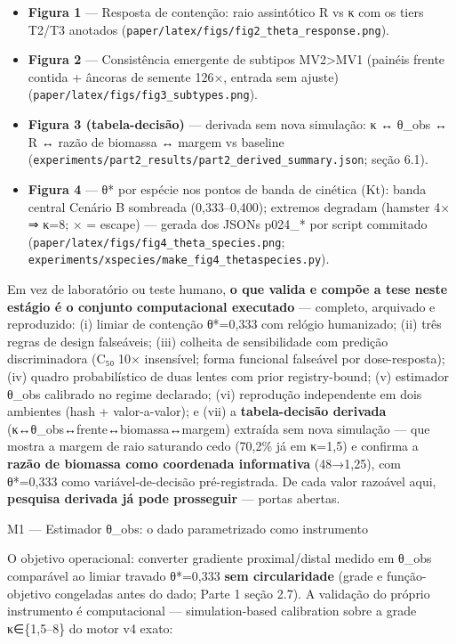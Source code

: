 \documentclass[12pt,a4paper,oneside]{report}
\providecommand{\tightlist}{\setlength{\itemsep}{2pt}\setlength{\parskip}{0pt}}
\begin{document}
\begin{itemize}
\tightlist
\item
  \textbf{Figura 1} --- Resposta de contenção: raio assintótico R vs κ
  com os tiers T2/T3 anotados
  (\texttt{paper/latex/figs/fig2\_theta\_response.png}).
\item
  \textbf{Figura 2} --- Consistência emergente de subtipos
  MV2\textgreater MV1 (painéis frente contida + âncoras de semente 126×,
  entrada sem ajuste) (\texttt{paper/latex/figs/fig3\_subtypes.png}).
\item
  \textbf{Figura 3 (tabela-decisão)} --- derivada sem nova simulação: κ
  ↔ θ\_obs ↔ R ↔ razão de biomassa ↔ margem vs baseline
  (\texttt{experiments/part2\_results/part2\_derived\_summary.json};
  seção 6.1).
\item
  \textbf{Figura 4} --- θ* por espécie nos pontos de banda de cinética
  (Kt): banda central Cenário B sombreada (0,333--0,400); extremos
  degradam (hamster 4× ⇒ κ=8; × = escape) --- gerada dos JSONs p024\_*
  por script commitado
  (\texttt{paper/latex/figs/fig4\_theta\_species.png};
  \texttt{experiments/xspecies/make\_fig4\_thetaspecies.py}).
\end{itemize}

Em vez de laboratório ou teste humano, \textbf{o que valida e compõe a
tese neste estágio é o conjunto computacional executado} --- completo,
arquivado e reproduzido: (i) limiar de contenção θ*=0,333 com relógio
humanizado; (ii) três regras de design falseáveis; (iii) colheita de
sensibilidade com predição discriminadora (C₅₀ 10× insensível; forma
funcional falseável por dose-resposta); (iv) quadro probabilístico de
duas lentes com prior registry-bound; (v) estimador θ\_obs calibrado no
regime declarado; (vi) reprodução independente em dois ambientes (hash +
valor-a-valor); e (vii) a \textbf{tabela-decisão derivada}
(κ↔θ\_obs↔frente↔biomassa↔margem) extraída sem nova simulação --- que
mostra a margem de raio saturando cedo (70,2\% já em κ=1,5) e confirma a
\textbf{razão de biomassa como coordenada informativa} (48→1,25), com
θ*=0,333 como variável-de-decisão pré-registrada. De cada valor razoável
aqui, \textbf{pesquisa derivada já pode prosseguir} --- portas abertas.

M1 --- Estimador θ\_obs: o dado parametrizado como instrumento

O objetivo operacional: converter gradiente proximal/distal medido em
θ\_obs comparável ao limiar travado θ*=0,333 \textbf{sem circularidade}
(grade e função-objetivo congeladas antes do dado; Parte 1 seção 2.7). A
validação do próprio instrumento é computacional --- simulation-based
calibration sobre a grade κ∈\{1,5--8\} do motor v4 exato:
\end{document}
